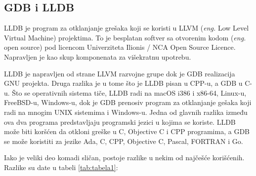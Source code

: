 \documentclass[a4paper]{article}
\begin{document}
\subsection{GDB i LLDB}
\label{subsec:lldb}
LLDB je program za otklanjanje grešaka koji se koristi u LLVM 
(\textit{eng.} Low Level Virtual Machine) projektima. To je besplatan softver sa 
otvorenim kodom (\textit{eng.} open source) pod licencom 
Univerziteta Ilionis / NCA Open Source Licence. Napravljen je kao 
skup komponenata za višekratnu upotrebu.

LLDB je napravljen od strane LLVM razvojne grupe dok je GDB 
realizacija GNU projekta. Druga razlika je u tome što je LLDB 
pisan u CPP-u, a GDB u C-u. Što se operativnih sistema tiče, LLDB 
radi na macOS i386 i x86-64, Linux-u,  FreeBSD-u, Windows-u, 
dok je GDB prenosiv program za otklanjanje gešaka koji radi na 
mnogim UNIX sistemima i Windows-u. Jedna od glavnih razlika 
između ova dva programa predstavljaju programski jezici u kojima 
se koriste. LLDB može biti koršćen da otkloni greške u C, Objective 
C i CPP programima, a GDB se može koristiti za jezike  Ada, C, 
CPP, Objective C, Pascal, FORTRAN i Go.

Iako je veliki deo komadi sličan, postoje razlike u nekim od 
najčešće korišćenih. Razlike su date u tabeli \ref{tab:tabela1}:
\end{document}

